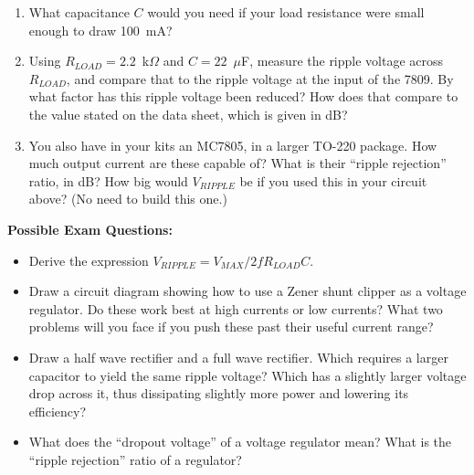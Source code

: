 \begin{enumerate}[wide]
\item What capacitance $C$ would you need if your load resistance were small enough to draw 100~mA?   

\item Using $R_{LOAD} = 2.2$~k$\Omega$ and $C = 22$~$\mu$F, measure the ripple voltage across $R_{LOAD}$, and compare that to the ripple voltage at the input of the 7809.  By what factor has this ripple voltage been reduced?  How does that compare to the value stated on the data sheet, which is given in dB?

\item You also have in your kits an MC7805, in a larger TO-220 package.  How much output current are these capable of?  What is their ``ripple rejection'' ratio, in dB?  How big would $V_{RIPPLE}$ be if you used this in your circuit above?  (No need to build this one.)

\end{enumerate}

\textbf{Possible Exam Questions:}

\begin{itemize}

\item Derive the expression $V_{RIPPLE}=V_{MAX}/2fR_{LOAD} C$.

\item Draw a circuit diagram showing how to use a Zener shunt clipper as a voltage regulator.  Do these work best at high currents or low currents?  What two problems will you face if you push these past their useful current range?

\item Draw a half wave rectifier and a full wave rectifier.  Which requires a larger capacitor to yield the same ripple voltage?  Which has a slightly larger voltage drop across it, thus dissipating slightly more power and lowering its efficiency?

\item What does the ``dropout voltage'' of a voltage regulator mean?  What is the ``ripple rejection'' ratio of a regulator?

\end{itemize}







